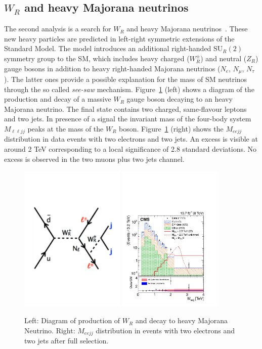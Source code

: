 \documentclass[epj]{webofc}
\begin{document}
%

\subsection{$W_R$ and heavy Majorana neutrinos}

The second analysis is a search for $W_R$ and heavy Majorana
neutrinos~\cite{Khachatryan:2014dka}. These new heavy particles are predicted in
left-right symmetric extensions of the Standard Model. 
The model introduces an additional right-handed SU$_R(2)$ symmetry
group to the SM, which includes heavy charged ($W^{\pm}_R$) and
neutral ($Z_R$) gauge bosons in addition to heavy right-handed
Majorana neutrinos ($N_e$, $N_\mu$, $N_{\tau}$). The latter ones
provide a possible explanation for the mass of SM neutrinos through
the so called {\it see-saw} mechanism.
Figure~\ref{heavyNeutrino} (left) shows a diagram of the production and decay of a
massive $W_R$ gauge boson decaying to an heavy Majorana neutrino.
The final state contains two charged, same-flavour leptons and two jets. In presence of
a signal the invariant mass of the four-body system $M_{\ell\ell jj}$ peaks
at the mass of the $W_R$ boson. Figure~\ref{heavyNeutrino} (right) shows the 
$M_{eejj}$ distribution in data events with two electrons and two jets. An excess is visible at around 2 TeV
corresponding to a local significance of 2.8 standard deviations. 
No excess is observed in the two muons plus two jets channel.
%
\begin{figure}[h]
\centering
\includegraphics[width=5cm,clip]{WRdiagram.pdf}
\includegraphics[width=5cm,clip]{CMS-EXO-13-008_Figure_002-a.pdf}
\caption{Left: Diagram of production of $W_R$ and decay to heavy
  Majorana Neutrino. Right: $M_{eejj}$ distribution in events with two electrons
  and two jets after full selection.}
\label{heavyNeutrino}       %
\end{figure}
%
\end{document}
